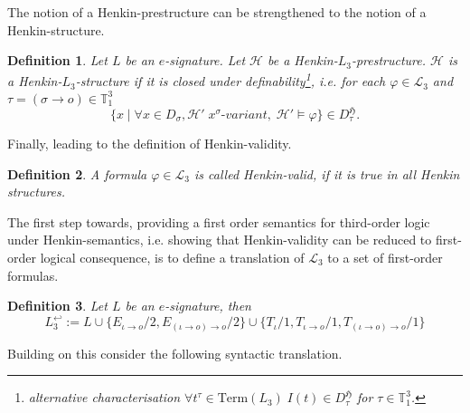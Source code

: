 \documentclass[11pt,a4paper]{article}
\newtheorem{mydef}{Definition}
\newcommand{\tofo}{\hookleftarrow}
\newcommand{\of}{\iota }
\newcommand{\os}{\iota \to o}
\newcommand{\ot}{(\iota \to o)\to o}
\begin{document}
The notion of a Henkin-prestructure can be strengthened to the notion of a Henkin-structure. 

\begin{mydef}
Let $L$ be an $e$-signature. Let $\mathcal{H}$ be a Henkin-$L_3$-prestructure. $\mathcal{H}$ is a  Henkin-$L_3$-structure if it is closed under definability\footnote{ alternative characterisation $ \forall t^{\tau} \in \mathrm{Term}(L_3)\; I(t) \in D_{\tau}^{\mathfrak{H}} $ for $\tau \in \mathbb{T}_1^3$.},  i.e. for each $\varphi \in\mathcal{L}_3$ and $\tau = (\sigma \to o)  \in \mathbb{T}_1^3$
\begin{equation*}
\{ x \mid \forall x \in D_{\sigma}, \mathcal{H}'\;  x^{\sigma}\textit{-variant} ,\; \mathcal{H}' \models \varphi\} \in D_{\tau}^{\mathfrak{H}}.
\end{equation*}
\end{mydef}

Finally, leading to the definition of Henkin-validity.

\begin{mydef}
A formula $\varphi \in \mathcal{L}_3$ is called Henkin-valid, if it is true in all Henkin structures.
\end{mydef}

The first step towards, providing a first order semantics for third-order logic under Henkin-semantics, i.e. showing that Henkin-validity can be reduced to first-order logical consequence, is to define a translation of $\mathcal{L}_3$ to a  set of first-order formulas. 


\begin{mydef}
Let $L$ be an $e$-signature, then 
\begin{equation*}
L_3^{\tofo} := L \cup \{ E_{\os} / 2 , E_{\ot}/2\} \cup \{ T_{\of} / 1, T_{\os} / 1 , T_{\ot}/1\}
\end{equation*}
\end{mydef} 

Building on this consider the following syntactic translation.
\end{document}
